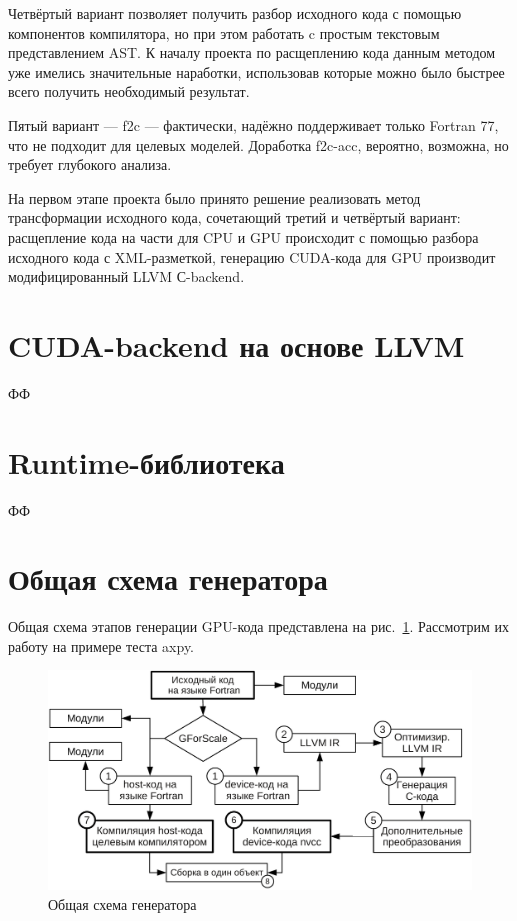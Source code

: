 \documentclass[a4,12pt]{report}
\begin{document}
Четвёртый вариант позволяет получить разбор исходного кода с помощью компонентов компилятора, но при этом работать c простым текстовым представлением AST. К началу проекта по расщеплению кода данным методом уже имелись значительные наработки, использовав которые можно было быстрее всего получить необходимый результат.


Пятый вариант --- f2c --- фактически, надёжно поддерживает только Fortran 77, что не подходит для целевых моделей. Доработка f2c-acc, вероятно, возможна, но требует глубокого анализа.


На первом этапе проекта было принято решение реализовать метод трансформации исходного кода, сочетающий третий и четвёртый вариант: расщепление кода на части для CPU и GPU происходит с помощью разбора исходного кода с XML-разметкой, генерацию CUDA-кода для GPU производит модифицированный LLVM С-backend.

\section{CUDA-backend на основе LLVM}

ФФ

\section{Runtime-библиотека}

ФФ

\section{Общая схема генератора}

Общая схема этапов генерации GPU-кода представлена на рис.~\ref{fig:toolchain_scheme}. Рассмотрим их работу на примере теста axpy.

\begin{figure}
\centering
\includegraphics[scale=0.5]{figures/toolchain_scheme}
\caption{Общая схема генератора}
\label{fig:toolchain_scheme}
\end{figure}
\end{document}
